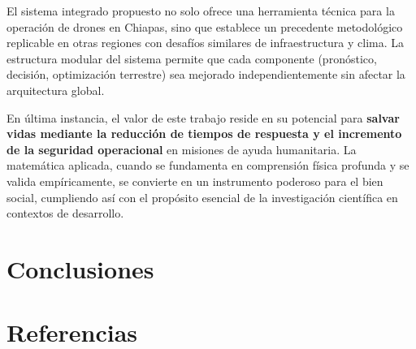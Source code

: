 \documentclass[
  spanish,
  us-letterpaper,
]{scrreprt}
\numberwithin{equation}{section}
\begin{document}
El sistema integrado propuesto no solo ofrece una herramienta técnica
para la operación de drones en Chiapas, sino que establece un precedente
metodológico replicable en otras regiones con desafíos similares de
infraestructura y clima. La estructura modular del sistema permite que
cada componente (pronóstico, decisión, optimización terrestre) sea
mejorado independientemente sin afectar la arquitectura global.

En última instancia, el valor de este trabajo reside en su potencial
para \textbf{salvar vidas mediante la reducción de tiempos de respuesta
y el incremento de la seguridad operacional} en misiones de ayuda
humanitaria. La matemática aplicada, cuando se fundamenta en comprensión
física profunda y se valida empíricamente, se convierte en un
instrumento poderoso para el bien social, cumpliendo así con el
propósito esencial de la investigación científica en contextos de
desarrollo.


\chapter{Conclusiones}\label{conclusiones}


\chapter*{Referencias}\label{referencias}

\end{document}
